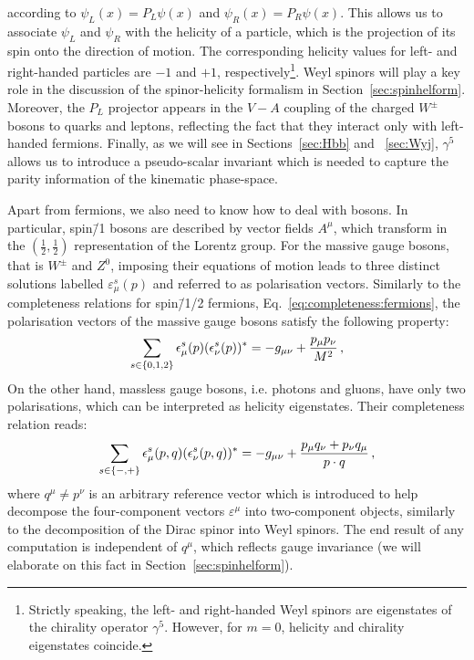 \documentclass[main.tex]{subfiles}
\begin{document}
according to $\psi_L(x) = P_L\psi(x)$ and $\psi_R(x) = P_R\psi(x)$. This allows us to associate $\psi_L$ and $\psi_R$ with the helicity of a particle, which is the projection of its spin onto the direction of motion. The corresponding helicity values for left- and right-handed particles are $-1$ and $+1$, respectively\footnote{Strictly speaking, the left- and right-handed Weyl spinors are eigenstates of the chirality operator $\gamma^5$. However, for $m=0$, helicity and chirality eigenstates coincide.}. Weyl spinors will play a key role in the discussion of the spinor-helicity formalism in Section~\ref{sec:spinhelform}. Moreover, the $P_L$ projector appears in the $V-A$ coupling of the charged $W^\pm$ bosons to quarks and leptons, reflecting the fact that they interact only with left-handed fermions. Finally, as we will see in Sections~\ref{sec:Hbb} and ~\ref{sec:Wyj}, $\gamma^5$ allows us to introduce a pseudo-scalar invariant which is needed to capture the parity information of the kinematic phase-space. 

Apart from fermions, we also need to know how to deal with bosons. In particular, spin\=/1 bosons are described by vector fields $A^\mu$, which transform in the $(\frac{1}{2}, \frac{1}{2})$ representation of the Lorentz group. For the massive gauge bosons, that is $W^\pm$ and $Z^0$, imposing their equations of motion leads to three distinct solutions labelled $\varepsilon_\mu^s(p)$ and referred to as polarisation vectors.
Similarly to the completeness relations for spin\=/1/2 fermions, Eq.~\ref{eq:completeness:fermions}, the polarisation vectors of the massive gauge bosons satisfy the following property:
\begin{equation}
    \sum_{s \in \{0,1,2\}} \epsilon_\mu^s(p) (\epsilon_\nu^s(p))^{\ast} = -g_{\mu\nu} + \frac{p_\mu p_\nu}{M^2} \,,
\end{equation}
On the other hand, massless gauge bosons, i.e. photons and gluons, have only two polarisations, which can be interpreted as helicity eigenstates. Their completeness relation reads:
\begin{equation} \label{eq:completeness:bosons}
    \sum_{s \in \{-,+\}} \epsilon_\mu^s(p, q) (\epsilon_\nu^s(p, q))^{\ast} = -g_{\mu\nu} + \frac{p_\mu q_\nu + p_\nu q_\mu}{p \cdot q} \,,
\end{equation}
where $q^\mu \neq p^\nu$ is an arbitrary reference vector which is introduced to help decompose the four-component vectors $\varepsilon^\mu$ into two-component objects, similarly to the decomposition of the Dirac spinor into Weyl spinors. The end result of any computation is independent of $q^\mu$, which reflects gauge invariance (we will elaborate on this fact in Section~\ref{sec:spinhelform}). 
\end{document}

